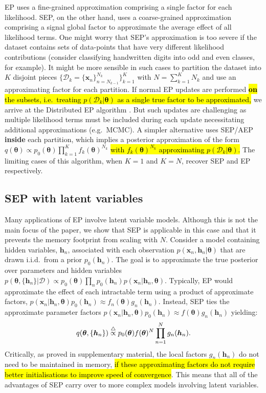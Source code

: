 EP uses a fine-grained approximation comprising a single factor for each likelihood. SEP, on the other hand, uses a coarse-grained approximation comprising a signal global factor to approximate the average effect of all likelihood terms. One might worry that SEP's approximation is too severe if the dataset contains sets of data-points that have very different likelihood contributions (consider classifying handwritten digits into odd and even classes, for example). It might be more sensible in such cases to partition the dataset into $K$ disjoint pieces $\{ \mathcal{D}_k = \{\bm{x}_n\}_{n=N_{k-1}}^{N_k} \}_{k=1}^{K}$ with $N = \sum_{k=1}^K N_k$ and use an approximating factor for each partition. If normal EP updates are performed \hl{\textbf{on} the subsets, i.e.~treating $p(\mathcal{D}_k|\bm{\theta})$ as a single true factor to be approximated,} we arrive at the Distributed EP algorithm \cite{gelman:dep, xu:sms}. But such updates are challenging as multiple likelihood terms must be included during each update necessitating additional approximations (e.g.~MCMC). A simpler alternative uses SEP/AEP \textbf{inside} each partition, which implies a posterior approximation of the form $q(\bm{\theta}) \propto p_0(\bm{\theta}) \prod_{k=1}^K f_{k}(\bm{\theta})^{N_k}$ \hl{with $f_{k}(\bm{\theta})^{N_k}$ approximating $p(\mathcal{D}_k|\bm{\theta})$.} The limiting cases of this algorithm, when $K=1$ and $K=N$, recover SEP and EP respectively. 


\subsection{SEP with latent variables}

Many applications of EP involve latent variable models. Although this is not the main focus of the paper, we show that SEP is applicable in this case and that it prevents the memory footprint from scaling with $N$. 
%
Consider a model containing hidden variables, $\bm{h}_n$, associated with each observation $p(\bm{x}_n, \bm{h}_n | \bm{\theta})$  that are drawn i.i.d.~from a prior $p_0(\bm{h}_n)$. The goal is to approximate the true posterior over parameters and hidden variables $p(\bm{\theta}, \{ \bm{h}_n\} | \mathcal{D}) \propto p_0(\bm{\theta}) \prod_n p_0(\bm{h}_n) p(\bm{x}_n | \bm{h}_n, \bm{\theta})$. 
%
Typically, EP would approximate the effect of each intractable term using a product of approximate factors, $p(\bm{x}_n | \bm{h}_n, \bm{\theta})p_0(\bm{h}_n)  \approx f_n(\bm{\theta}) g_n(\bm{h}_n) $. Instead, SEP ties the approximate parameter factors $p(\bm{x}_n | \bm{h}_n, \bm{\theta})p_0(\bm{h}_n)  \approx f(\bm{\theta}) g_n(\bm{h}_n) $ yielding:
\begin{equation}
q(\bm{\theta}, \{ \bm{h}_n\}) \buildrel\triangle\over \propto p_0(\bm{\theta}) f(\bm{\theta})^N \prod_{n=1}^N g_n(\bm{h}_n) .
\end{equation}
%
Critically, as proved in supplementary material, the local factors $g_n(\bm{h}_n)$ do not need to be maintained in memory, \hl{if these approximating factors do not require better initialisations to improve speed of convergence}. This means that all of the advantages of SEP carry over to more complex models involving latent variables.

